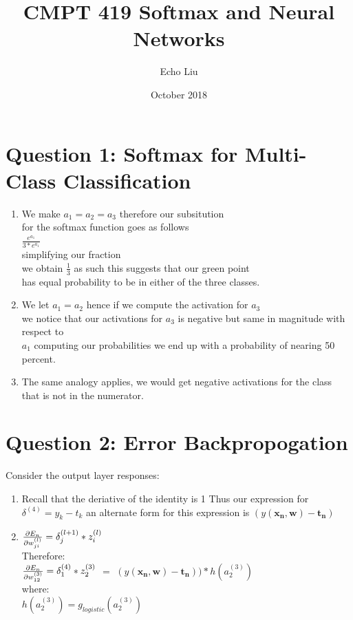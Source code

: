 \documentclass[12pt,letterpaper]{article}
\title{CMPT 419 Softmax and Neural Networks}
\author{Echo Liu}
\date{October 2018}
\renewcommand{\vec}[1]{\mathbf{#1}}
\begin{document}
\begin{titlepage}
\maketitle
\end{titlepage}

\section{Question 1: Softmax for Multi-Class Classification}
\begin{enumerate}
	\item We make $a_{1} =a_{2} = a_{3}$ therefore our subsitution
	\\ for the softmax function goes as follows
	\\ $\frac{e^{a_{1}}}{ 3*e^{a_{1}} }$
	\\ simplifying our fraction 
	\\ we obtain $\frac{1}{3}$ as such this suggests that our green point
	\\ has equal probability to be in either of the three classes.

	\item We let $a_{1}=a_{2}$ hence if we compute the activation for $a_{3}$
	\\ we notice that our activations for $a_{3}$ is negative but same in magnitude with respect to 
	\\ $a_{1}$ computing our probabilities we end up with a probability of nearing 50 percent. 

	\item The same analogy applies, we would get negative activations for the class that is not in the numerator.


\end{enumerate}

\section{Question 2: Error Backpropogation}

Consider the output layer responses:
\begin{enumerate}

	\item Recall that the deriative of the identity is 1
	Thus our expression for $\delta^{(4)} = y_{k} - t_{k}$
	an alternate form for this expression is $(y(\vec{x_{n}},\vec{w})-\vec{t_{n}})$ 
	
	\item $\pdv{E_{n}}{w_{ji}^{(l)}} = \delta_{j}^{(l+1)}*z_{i}^{(l)} \quad$
	\\
	Therefore:
	\\
	$\pdv{E_{n}}{w_{12}^{(3)}} = \delta_{1}^{(4)}*z_{2}^{(3)}$
	$=$
	$(y(\vec{x_{n}},\vec{w})-\vec{t_{n}}))*h(a_{2}^{(3)})$
	\\
	where:
	\\
	$h(a_{2}^{(3)})=g_{logistic}(a_{2}^{(3)})$
\end{enumerate}
\end{document}
